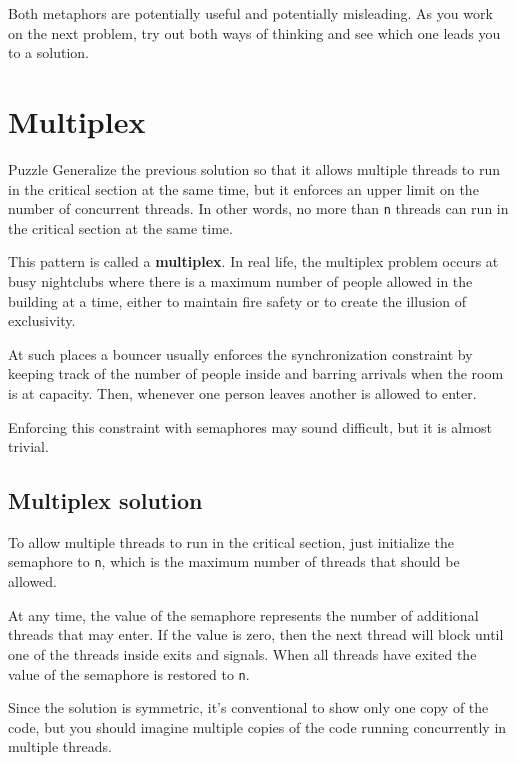 Both metaphors are potentially useful and potentially misleading.
As you work on the next problem, try out both ways of thinking
and see which one leads you to a solution.


\section{Multiplex}

\begin{puzzlebox}{Puzzle}
Generalize the previous solution so that it allows multiple
threads to run in the critical section at the same time, but it
enforces an upper limit on the number of concurrent threads.  In other
words, no more than {\tt n} threads can run in the critical section at
the same time.

This pattern is called a {\bf multiplex}.  In real life, the multiplex
problem occurs at busy nightclubs where there is a maximum number of
people allowed in the building at a time, either to maintain fire
safety or to create the illusion of exclusivity.

At such places a bouncer usually enforces the synchronization
constraint by keeping track of the number of people inside
and barring arrivals when the room is at capacity.  Then,
whenever one person leaves another is allowed to enter.

Enforcing this constraint with semaphores may sound difficult, but it
is almost trivial.
\end{puzzlebox}


\subsection*{Multiplex solution}

To allow multiple threads to run in the critical section, just
initialize the semaphore to {\tt n}, which is the maximum number
of threads that should be allowed.

At any time, the value of the semaphore represents the
number of additional threads that may enter.  If the value is zero,
then the next thread will block until one of the threads inside
exits and signals.  When all threads have exited the value of the
semaphore is restored to {\tt n}.

Since the solution is symmetric, it's conventional to show only one
copy of the code, but you should imagine multiple copies of the code
running concurrently in multiple threads.

